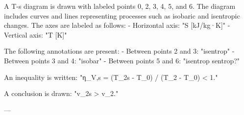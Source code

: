 A T-s diagram is drawn with labeled points 0, 2, 3, 4, 5, and 6. The diagram includes curves and lines representing processes such as isobaric and isentropic changes. The axes are labeled as follows:  
- Horizontal axis: "S [kJ/kg·K]"  
- Vertical axis: "T [K]"  

The following annotations are present:  
- Between points 2 and 3: "isentrop"  
- Between points 3 and 4: "isobar"  
- Between points 5 and 6: "isentrop sentrop?"  

An inequality is written:  
"η_V,s = (T_2s - T_0) / (T_2 - T_0) < 1."  

A conclusion is drawn:  
"v_2s > v_2."  

---